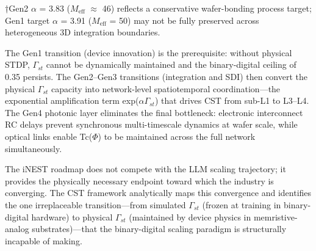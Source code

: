 \documentclass[a4paper,12pt]{article}
\begin{document}
†Gen2 $\alpha$ = 3.83 ($M_{\text{eff}}$ $\approx$ 46) reflects a conservative wafer-bonding process target; Gen1 target $\alpha$ = 3.91 ($M_{\text{eff}}$ = 50) may not be fully preserved across heterogeneous 3D integration boundaries.


The Gen1 transition (device innovation) is the prerequisite: without physical STDP, $\Gamma_{st}$ cannot be dynamically maintained and the binary-digital ceiling of 0.35 persists. The Gen2--Gen3 transitions (integration and SDI) then convert the physical $\Gamma_{st}$ capacity into network-level spatiotemporal coordination---the exponential amplification term exp($\alpha$\cdot$\Gamma_{st}$) that drives CST from sub-L1 to L3--L4. The Gen4 photonic layer eliminates the final bottleneck: electronic interconnect RC delays prevent synchronous multi-timescale dynamics at wafer scale, while optical links enable Tc($\Phi$) to be maintained across the full network simultaneously.


The iNEST roadmap does not compete with the LLM scaling trajectory; it provides the physically necessary endpoint toward which the industry is converging. The CST framework analytically maps this convergence and identifies the one irreplaceable transition---from simulated $\Gamma_{st}$ (frozen at training in binary-digital hardware) to physical $\Gamma_{st}$ (maintained by device physics in memristive-analog substrates)---that the binary-digital scaling paradigm is structurally incapable of making.
\end{document}
